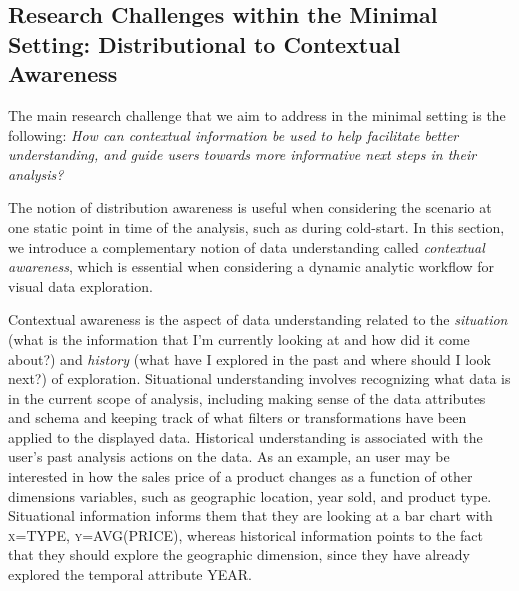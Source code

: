 \subsection{Research Challenges within the Minimal Setting: Distributional to Contextual Awareness}


\par The main research challenge that we aim to address in the minimal setting is the following: {\em How can contextual information be used to help facilitate better understanding, and guide users towards more informative next steps in their analysis?}

\par The notion of distribution awareness is useful when considering the scenario at one static point in time of the analysis, such as during cold-start. In this section, we introduce a complementary notion of data understanding called \textit{contextual awareness}, which is essential when considering a dynamic analytic workflow for visual data exploration.
\par Contextual awareness is the aspect of 
data understanding related to 
the \textit{situation} (what is the information 
that I'm currently looking at and how did it come about?) 
and \textit{history} (what have I explored in the past 
and where should I look next?) of exploration. 
Situational understanding involves recognizing 
what data is in the current 
scope of analysis, 
including making sense of the data attributes 
and schema and keeping track of what filters or 
transformations have been applied to the displayed data. 
Historical understanding is associated with 
the user's past analysis actions on the data. 
As an example, an user may be interested 
in how the sales price of a product changes 
as a function of other dimensions variables, 
such as geographic location, year sold, and product type. 
Situational information informs them that they are 
looking at a bar chart with \textsc{x=TYPE}, \textsc{y=AVG(PRICE)}, 
whereas historical information points 
to the fact that they should explore the 
geographic dimension, since they have 
already explored the temporal attribute \textsc{YEAR}.

